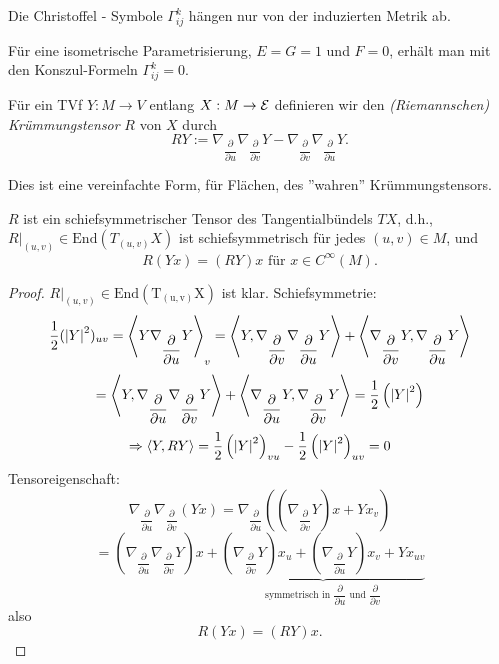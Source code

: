 \begin{corollary}
	Die Christoffel - Symbole $ \Gamma_{ij}^k $ hängen nur von der induzierten Metrik ab.
\end{corollary}

\begin{example}
	
	Für eine isometrische Parametrisierung, $  E = G = 1 $ und $  F = 0 $, erhält man mit den Konszul-Formeln $ \Gamma_{ij}^k = 0 $.
	
\end{example}


\begin{definition}
	
	Für ein TVf $ Y : M \rightarrow V $ entlang $ X: M \rightarrow \mathcal E $ definieren wir den \emph{(Riemannschen) Krümmungstensor} $ R $ von $X$ durch 
		\[ RY := \nabla_{\dfrac{\partial}{\partial u}}\nabla_{\dfrac{\partial}{\partial v}}Y - \nabla_{\dfrac{\partial}{\partial v}}\nabla_{\dfrac{\partial}{\partial u}}Y. \]
	
\end{definition}

\begin{remark}
	
	Dies ist eine vereinfachte Form, für Flächen, des ''wahren'' Krümmungstensors.
	
\end{remark}

\begin{lemma}
	
	$ R $ ist ein schiefsymmetrischer Tensor des Tangentialbündels $ TX $, d.h., 
	$R\big|_{(u,v)} \in \mathrm{End}(T_{(u,v)}X) $ ist schiefsymmetrisch für jedes $ (u,v) \in M $, und 
		\[ R(Yx) = (RY)x \text{ für } x \in C^\infty(M). \]
	
\end{lemma}

\begin{proof}
	
	$R\big|_{(u,v)} \in \mathrm{End(T_{(u,v)}X)}$ ist klar.
	Schiefsymmetrie:
		\[\frac12 (\left| Y\right|^2)_{uv} = \left \langle Y \nabla_{\dfrac{\partial}{\partial u}}Y \right\rangle_v = \left \langle Y, \nabla_{\dfrac{\partial}{\partial v}}\nabla_{\dfrac{\partial}{\partial u}}Y \right\rangle + \left \langle \nabla_{\dfrac{\partial}{\partial v}}Y,\nabla_{\dfrac{\partial}{\partial u}}Y \right\rangle \]
		\[ = \left \langle Y, \nabla_{\dfrac{\partial}{\partial u}}\nabla_{\dfrac{\partial}{\partial v}}Y \right\rangle + \left \langle \nabla_{\dfrac{\partial}{\partial u}}Y, \nabla_{\dfrac{\partial}{\partial v}}Y \right\rangle = \frac12 \left( \left| Y\right|^2\right)  \]
		\[ \Rightarrow \left \langle Y,RY \right\rangle = \frac12 \left(\left| Y\right|^2\right)_{vu}- \frac12\left(\left| Y\right|^2\right)_{uv}=0 \]
	Tensoreigenschaft:
		\[ \nabla_{\dfrac{\partial}{\partial u}}\nabla_{\dfrac{\partial}{\partial v}}(Yx)= \nabla_{\dfrac{\partial}{\partial u}}\left(\left( \nabla_{\dfrac{\partial}{\partial v}}Y \right)x + Yx_v\right) \]
		\[ = \left( \nabla_{\dfrac{\partial}{\partial u}} \nabla_{\dfrac{\partial}{\partial v}} Y \right)x + \underbrace{\left( \nabla_{\dfrac{\partial}{\partial v}}Y \right)x_u + \left( \nabla_{\dfrac{\partial}{\partial u}}Y \right)x_v + Yx_{uv}}_{\text{symmetrisch in } \dfrac{\partial}{\partial u} \text{ und } \dfrac{\partial}{\partial v}} \]
	also
		\[ R(Yx)=(RY)x. \]
	
\end{proof}
